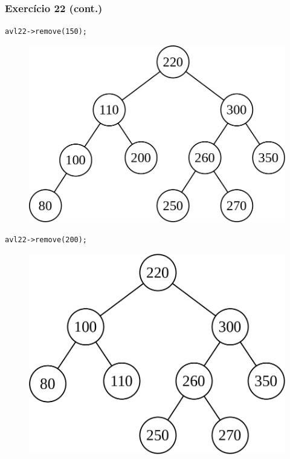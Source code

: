 \documentclass[aspectratio=169]{beamer}
\begin{document}
\begin{frame}[fragile]\frametitle{Exercício 22 (cont.)}
\texttt{avl22->remove(150);}
\begin{figure}[h]
	\centering
	\includegraphics[height=0.25\paperheight]{imagens/avl-exercicio22f.png}
\end{figure}
\texttt{avl22->remove(200);}
\begin{figure}[h]
	\centering
	\includegraphics[height=0.25\paperheight]{imagens/avl-exercicio22g.png}
\end{figure}
\end{frame}
\end{document}
